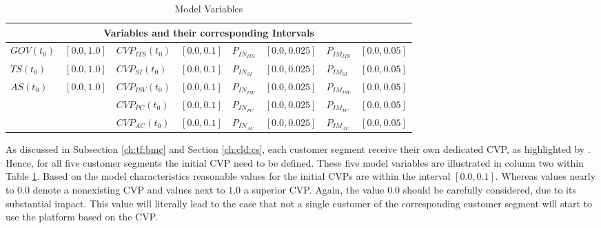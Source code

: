 \begin{table}[t]
	\centering
	\begin{tabular}{llllllll}
		\toprule 
		\multicolumn{8}{c}{\footnotesize \textbf{Variables and their corresponding Intervals}} \\ \midrule
		\footnotesize $GOV(t_0)$ & \footnotesize $[0.0,1.0]$ & \footnotesize $CVP_{ITS}(t_0)$ & \footnotesize $[0.0,0.1]$ & \footnotesize $P_{IN_{ITS}}$ & \footnotesize $[0.0,0.025]$ & \footnotesize $P_{IM_{ITS}}$ & \footnotesize $[0.0,0.05]$ \\
		\footnotesize $TS(t_0)$ & \footnotesize $[0.0,1.0]$ & \footnotesize $CVP_{SI}(t_0)$ & \footnotesize $[0.0,0.1]$ & \footnotesize $P_{IN_{SI}}$ & \footnotesize $[0.0,0.025]$ & \footnotesize $P_{IM_{SI}}$ & \footnotesize $[0.0,0.05]$ \\
		\footnotesize $AS(t_0)$ & \footnotesize $[0.0,1.0]$ & \footnotesize $CVP_{ISV}(t_0)$ & \footnotesize $[0.0,0.1]$ & \footnotesize $P_{IN_{ISV}}$ & \footnotesize $[0.0,0.025]$ & \footnotesize $P_{IM_{ISV}}$ & \footnotesize $[0.0,0.05]$ \\
		& & \footnotesize $CVP_{PC}(t_0)$ & \footnotesize $[0.0,0.1]$ & \footnotesize $P_{IN_{PC}}$ & \footnotesize $[0.0,0.025]$ & \footnotesize $P_{IM_{PC}}$ & \footnotesize $[0.0,0.05]$ \\
		& & \footnotesize $CVP_{AC}(t_0)$ & \footnotesize $[0.0,0.1]$ & \footnotesize $P_{IN_{AC}}$ & \footnotesize $[0.0,0.025]$ & \footnotesize $P_{IM_{AC}}$ & \footnotesize $[0.0,0.05]$ \\ \bottomrule
	\end{tabular}
	\caption{Model Variables}
	\label{tab:mvar}
\end{table}

\setlength{\tabcolsep}{\originalTabcolsep}

As discussed in Subsection \ref{ch:tf:bmc} and Section \ref{ch:cld:cs}, each customer segment receive their own dedicated \ac{CVP}, as highlighted by \citet{Johnson2008}. Hence, for all five customer segments the initial \ac{CVP} need to be defined. These five model variables are illustrated in column two within Table \ref{tab:mvar}. Based on the model characteristics reasonable values for the initial \acp{CVP} are within the interval $[0.0,0.1]$. Whereas  values nearly to $0.0$ denote a nonexisting \ac{CVP} and values next to $1.0$ a superior \ac{CVP}. Again, the value $0.0$ should be carefully considered, due to its substantial impact. This value will literally lead to the case that not a single customer of the corresponding customer segment will start to use the platform based on the \ac{CVP}.

